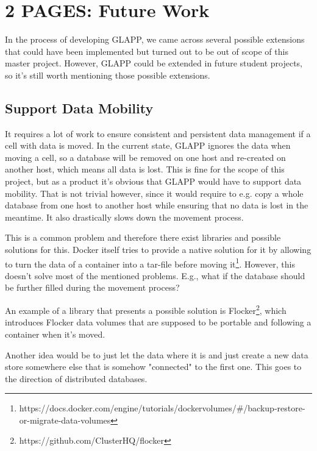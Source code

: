 \documentclass{seal_thesis}
\begin{document}
\chapter{2 PAGES: Future Work}\label{ch:futurework}

In the process of developing GLAPP, we came across several possible extensions that could have been implemented but turned out to be out of scope of this master project.
However, GLAPP could be extended in future student projects, so it's still worth mentioning those possible extensions.

\section{Support Data Mobility}
It requires a lot of work to ensure consistent and persistent data management if a cell with data is moved.
In the current state, GLAPP ignores the data when moving a cell, so a database will be removed on one host and re-created on another host, which means all data is lost.
This is fine for the scope of this project, but as a product it's obvious that GLAPP would have to support data mobility.
That is not trivial however, since it would require to e.g. copy a whole database from one host to another host while ensuring that no data is lost in the meantime.
It also drastically slows down the movement process.

This is a common problem and therefore there exist libraries and possible solutions for this.
Docker itself tries to provide a native solution for it by allowing to turn the data of a container into a tar-file before moving it\footnote{https://docs.docker.com/engine/tutorials/dockervolumes/\#/backup-restore-or-migrate-data-volumes}.
However, this doesn't solve most of the mentioned problems. E.g., what if the database should be further filled during the movement process?

An example of a library that presents a possible solution is Flocker\footnote{https://github.com/ClusterHQ/flocker}, which introduces Flocker data volumes that are supposed to be portable and following a container when it's moved.

Another idea would be to just let the data where it is and just create a new data store somewhere else that is somehow "connected" to the first one. This goes to the direction of distributed databases.
\end{document}
